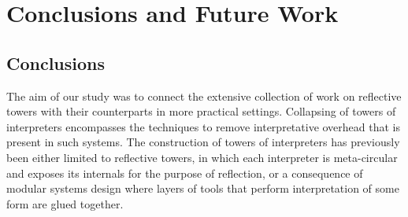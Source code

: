 \documentclass[a4paper,12pt,twoside,openright]{report}
\theoremstyle{definition}
\begin{document}
\section{Conclusions and Future Work}\label{sec:conclusion}
\subsection{Conclusions}
The aim of our study was to connect the extensive collection of work on reflective towers with their counterparts in more practical settings. Collapsing of towers of interpreters encompasses the techniques to remove interpretative overhead that is present in such systems. The construction of towers of interpreters has previously been either limited to reflective towers, in which each interpreter is meta-circular and exposes its internals for the purpose of reflection, or a consequence of modular systems design where layers of tools that perform interpretation of some form are glued together.
\end{document}
